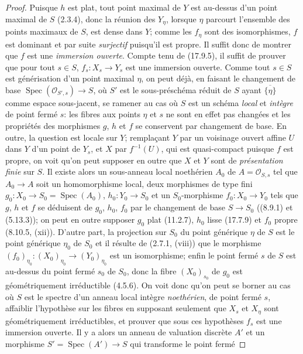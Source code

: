 \begin{proof}
Puisque $h$ est plat, tout point maximal de $Y$ est au-dessus d'un point maximal de $S$
(2.3.4), donc la réunion des $Y_\eta$, lorsque $\eta$ parcourt l'ensemble des points
maximaux de $S$, est dense dans $Y$; comme les $f_\eta$ sont des isomorphismes, $f$
est dominant et par suite \emph{surjectif} puisqu'il est propre. Il suffit donc de montrer
que $f$ est une \emph{immersion ouverte}. Compte tenu de (17.9.5), il suffit de prouver
que pour tout $s\in S$, $f_s:X_s\to Y_s$ est une immersion ouverte.
Comme tout $s\in S$ est générisation d'un point maximal $\eta$, on peut déjà, en
faisant le changement de base $\operatorname{Spec}(\mathcal O_{S',s})\to S$, où $S'$
est le sous-préschéma réduit de $S$ ayant $\overline{\{\eta\}}$ comme espace
sous-jacent, se ramener au cas où $S$ est un schéma \emph{local} et \emph{intègre} de point fermé $s$:
les fibres aux points $\eta$ et $s$ ne sont en effet pas changées et les propriétés des
morphismes $g$, $h$ et $f$ se conservent par changement de base. En outre, la question
est locale sur $Y$; remplaçant $Y$ par un voisinage ouvert affine $U$ dans $Y$ d'un point
de $Y_s$, et $X$ par $f^{-1}(U)$, qui est quasi-compact puisque $f$ est propre, on voit
qu'on peut supposer en outre que $X$ et $Y$ sont de \emph{présentation finie} sur $S$.
Il existe alors un sous-anneau local noethérien $A_0$ de
$A=\mathcal O_{S,s}$ tel que $A_0\to A$ soit un homomorphisme local, deux morphismes
de type fini $g_0:X_0\to S_0=\operatorname{Spec}(A_0)$,
$h_0:Y_0\to S_0$ et un $S_0$-morphisme
$f_0:X_0\to Y_0$ tels que $g$, $h$ et $f$ se déduisent de $g_0$, $h_0$, $f_0$ par le
changement de base $S\to S_0$ ((8.9.1) et (5.13.3)); on peut en outre supposer $g_0$
plat (11.2.7), $h_0$ lisse (17.7.9) et $f_0$ propre (8.10.5, (xii)). D'autre part, la
projection sur $S_0$ du point générique $\eta$ de $S$ est le point générique $\eta_0$ de
$S_0$ et il résulte de (2.7.1, (viii)) que le morphisme
$(f_0)_{\eta_0}:(X_0)_{\eta_0}\to(Y_0)_{\eta_0}$ est un isomorphisme; enfin le point
fermé $s$ de $S$ est au-dessus du point fermé $s_0$ de $S_0$, donc la fibre
$(X_0)_{s_0}$ de $g_0$ est géométriquement irréductible (4.5.6).
On voit donc qu'on peut se borner au cas où $S$ est le spectre d'un anneau local intègre
\emph{noethérien}, de point fermé $s$, affaiblir l'hypothèse sur les fibres en supposant seulement
que $X_s$ et $X_\eta$ sont géométriquement irréductibles, et prouver que sous ces
hypothèses $f_s$ est une immersion ouverte. Il y a alors un anneau de valuation discrète
$A'$ et un morphisme $S'=\operatorname{Spec}(A')\to S$ qui transforme le point fermé

\end{proof}
